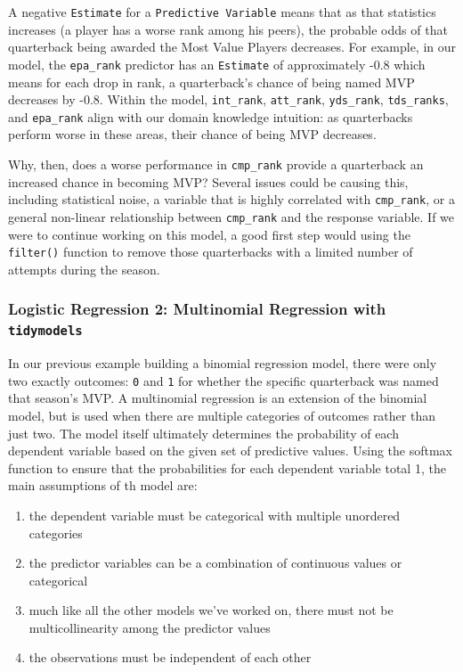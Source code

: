 \documentclass[
  letterpaper,
]{krantz}
\providecommand{\tightlist}{%
  \setlength{\itemsep}{0pt}\setlength{\parskip}{0pt}}\usepackage{longtable,booktabs,array}
\begin{document}
A negative \texttt{Estimate} for a \texttt{Predictive\ Variable} means
that as that statistics increases (a player has a worse rank among his
peers), the probable odds of that quarterback being awarded the Most
Value Players decreases. For example, in our model, the
\texttt{epa\_rank} predictor has an \texttt{Estimate} of approximately
-0.8 which means for each drop in rank, a quarterback's chance of being
named MVP decreases by -0.8. Within the model, \texttt{int\_rank},
\texttt{att\_rank}, \texttt{yds\_rank}, \texttt{tds\_ranks}, and
\texttt{epa\_rank} align with our domain knowledge intuition: as
quarterbacks perform worse in these areas, their chance of being MVP
decreases.

Why, then, does a worse performance in \texttt{cmp\_rank} provide a
quarterback an increased chance in becoming MVP? Several issues could be
causing this, including statistical noise, a variable that is highly
correlated with \texttt{cmp\_rank}, or a general non-linear relationship
between \texttt{cmp\_rank} and the response variable. If we were to
continue working on this model, a good first step would using the
\texttt{filter()} function to remove those quarterbacks with a limited
number of attempts during the season.

\hypertarget{logistic-regression-2-multinomial-regression-with-tidymodels}{%
\subsubsection{\texorpdfstring{Logistic Regression 2: Multinomial
Regression with
\texttt{tidymodels}}{Logistic Regression 2: Multinomial Regression with tidymodels}}\label{logistic-regression-2-multinomial-regression-with-tidymodels}}

In our previous example building a binomial regression model, there were
only two exactly outcomes: \texttt{0} and \texttt{1} for whether the
specific quarterback was named that season's MVP. A multinomial
regression is an extension of the binomial model, but is used when there
are multiple categories of outcomes rather than just two. The model
itself ultimately determines the probability of each dependent variable
based on the given set of predictive values. Using the softmax function
to ensure that the probabilities for each dependent variable total 1,
the main assumptions of th model are:

\begin{enumerate}
\def\labelenumi{\arabic{enumi}.}
\tightlist
\item
  the dependent variable must be categorical with multiple unordered
  categories
\item
  the predictor variables can be a combination of continuous values or
  categorical
\item
  much like all the other models we've worked on, there must not be
  multicollinearity among the predictor values
\item
  the observations must be independent of each other
\end{enumerate}
\end{document}
